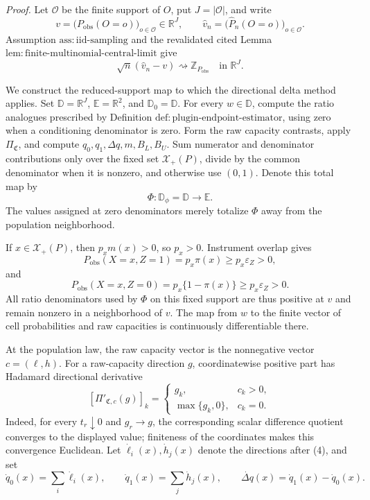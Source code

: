 \noindent\textit{Proof.}
Let \(\mathcal O\) be the finite support of \(O\), put
\(J=|\mathcal O|\), and write
\[
v=\bigl(P_{\mathrm{obs}}(O=o)\bigr)_{o\in\mathcal O}\in\mathbb R^J,
\qquad
\widehat v_n=
\bigl(\widehat P_n(O=o)\bigr)_{o\in\mathcal O}.
\]
Assumption \(\mathrm{ass{:}iid\text{-}sampling}\) and the revalidated
cited Lemma \(\mathrm{lem{:}finite\text{-}multinomial\text{-}central\text{-}limit}\)
give
\[
\sqrt n(\widehat v_n-v)\rightsquigarrow
\mathbb Z_{P_{\mathrm{obs}}}
\quad\text{in }\mathbb R^J.
\tag{1}
\]

We construct the reduced-support map to which the directional delta
method applies.  Set \(\mathbb D=\mathbb R^J\),
\(\mathbb E=\mathbb R^2\), and \(\mathbb D_0=\mathbb D\).  For every
\(w\in\mathbb D\), compute the ratio analogues prescribed by Definition
\(\mathrm{def{:}plugin\text{-}endpoint\text{-}estimator}\), using zero
when a conditioning denominator is zero.  Form the raw capacity contrasts,
apply \(\Pi_{\mathfrak C}\), and compute
\(q_0,q_1,\Delta q,m,B_L,B_U\).  Sum numerator and denominator
contributions only over the fixed set \(\mathcal X_+(P)\), divide by the
common denominator when it is nonzero, and otherwise use \((0,1)\).
Denote this total map by
\[
\Phi:\mathbb D_\phi=\mathbb D\longrightarrow\mathbb E.
\tag{2}
\]
The values assigned at zero denominators merely totalize \(\Phi\) away
from the population neighborhood.

If \(x\in\mathcal X_+(P)\), then \(p_xm(x)>0\), so \(p_x>0\).
Instrument overlap gives
\[
P_{\mathrm{obs}}(X=x,Z=1)=p_x\pi(x)
\ge p_x\varepsilon_Z>0,
\]
and
\[
P_{\mathrm{obs}}(X=x,Z=0)=p_x\{1-\pi(x)\}
\ge p_x\varepsilon_Z>0.
\tag{3}
\]
All ratio denominators used by \(\Phi\) on this fixed support are thus
positive at \(v\) and remain nonzero in a neighborhood of \(v\).  The
map from \(w\) to the finite vector of cell probabilities and raw
capacities is continuously differentiable there.

At the population law, the raw capacity vector is the nonnegative vector
\(c=(\ell,h)\).  For a raw-capacity direction \(g\), coordinatewise
positive part has Hadamard directional derivative
\[
[\Pi'_{\mathfrak C,c}(g)]_k=
\begin{cases}
g_k,&c_k>0,\\
\max\{g_k,0\},&c_k=0.
\end{cases}
\tag{4}
\]
Indeed, for every \(t_r\downarrow0\) and \(g_r\to g\), the corresponding
scalar difference quotient converges to the displayed value; finiteness
of the coordinates makes this convergence Euclidean.  Let
\(\dot\ell_i(x),\dot h_j(x)\) denote the directions after (4), and set
\[
\dot q_0(x)=\sum_i\dot\ell_i(x),\qquad
\dot q_1(x)=\sum_j\dot h_j(x),\qquad
\dot{\Delta q}(x)=\dot q_1(x)-\dot q_0(x).
\tag{5}
\]

